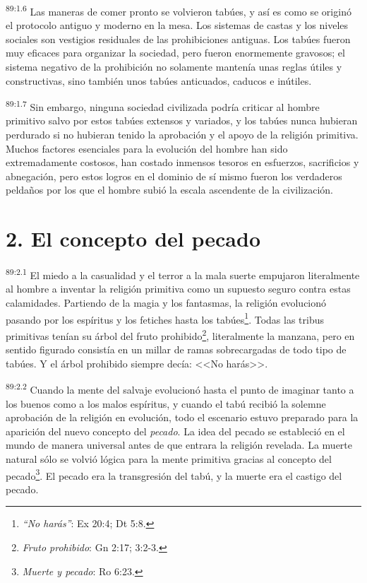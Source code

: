 \par
\textsuperscript{89:1.6} Las maneras de comer pronto se volvieron tabúes, y así es como se originó el protocolo antiguo y moderno en la mesa. Los sistemas de castas y los niveles sociales son vestigios residuales de las prohibiciones antiguas. Los tabúes fueron muy eficaces para organizar la sociedad, pero fueron enormemente gravosos; el sistema negativo de la prohibición no solamente mantenía unas reglas útiles y constructivas, sino también unos tabúes anticuados, caducos e inútiles.

\par
\textsuperscript{89:1.7} Sin embargo, ninguna sociedad civilizada podría criticar al hombre primitivo salvo por estos tabúes extensos y variados, y los tabúes nunca hubieran perdurado si no hubieran tenido la aprobación y el apoyo de la religión primitiva. Muchos factores esenciales para la evolución del hombre han sido extremadamente costosos, han costado inmensos tesoros en esfuerzos, sacrificios y abnegación, pero estos logros en el dominio de sí mismo fueron los verdaderos peldaños por los que el hombre subió la escala ascendente de la civilización.

\section*{2. El concepto del pecado}
\par
\textsuperscript{89:2.1} El miedo a la casualidad y el terror a la mala suerte empujaron literalmente al hombre a inventar la religión primitiva como un supuesto seguro contra estas calamidades. Partiendo de la magia y los fantasmas, la religión evolucionó pasando por los espíritus y los fetiches hasta los tabúes\footnote{\textit{``No harás''}: Ex 20:4; Dt 5:8.}. Todas las tribus primitivas tenían su árbol del fruto prohibido\footnote{\textit{Fruto prohibido}: Gn 2:17; 3:2-3.}, literalmente la manzana, pero en sentido figurado consistía en un millar de ramas sobrecargadas de todo tipo de tabúes. Y el árbol prohibido siempre decía: <<No harás>>.

\par
\textsuperscript{89:2.2} Cuando la mente del salvaje evolucionó hasta el punto de imaginar tanto a los buenos como a los malos espíritus, y cuando el tabú recibió la solemne aprobación de la religión en evolución, todo el escenario estuvo preparado para la aparición del nuevo concepto del \textit{pecado}. La idea del pecado se estableció en el mundo de manera universal antes de que entrara la religión revelada. La muerte natural sólo se volvió lógica para la mente primitiva gracias al concepto del pecado\footnote{\textit{Muerte y pecado}: Ro 6:23.}. El pecado era la transgresión del tabú, y la muerte era el castigo del pecado.

